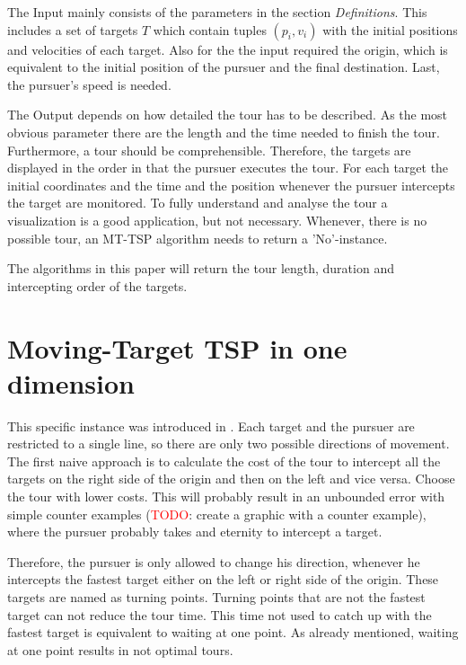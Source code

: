 \documentclass[english,version-2019-07]{uzl-thesis}
\begin{document}
The Input mainly consists of the parameters in the section \emph{Definitions}. This includes a set of targets $T$ which contain tuples $(p_i, v_i)$ with the initial positions and velocities of each target. Also for the the input required the origin, which is equivalent to the initial position of the pursuer and the final destination. Last, the pursuer's speed is needed.

The Output depends on how detailed the tour has to be described. As the most obvious parameter there are the length and the time needed to finish the tour. Furthermore, a tour should be comprehensible. Therefore, the targets are displayed in the order in that the pursuer executes the tour. For each target the initial coordinates and the time and the position whenever the pursuer intercepts the target are monitored. To fully understand and analyse the tour a visualization is a good application, but not necessary. Whenever, there is no possible tour, an MT-TSP algorithm needs to return a 'No'-instance.

The algorithms in this paper will return the tour length, duration and intercepting order of the targets.

\chapter{Moving-Target TSP in one dimension}%
\label{chapter-use}

This specific instance was introduced in \cite{helvig}. Each target and the pursuer are restricted to a single line, so there are only two possible directions of movement. The first naive approach is to calculate the cost of the tour to intercept all the targets on the right side of the origin and then on the left and vice versa. Choose the tour with lower costs. This will probably result in an unbounded error with simple counter examples (\textcolor{red}{TODO}: create a graphic with a counter example), where the pursuer probably takes and eternity to intercept a target.

Therefore, the pursuer is only allowed to change his direction, whenever he intercepts the fastest target either on the left or right side of the origin. These targets are named as turning points. Turning points that are not the fastest target can not reduce the tour time. This time not used to catch up with the fastest target is equivalent to waiting at one point. As already mentioned, waiting at one point results in not optimal tours. 
\end{document}
